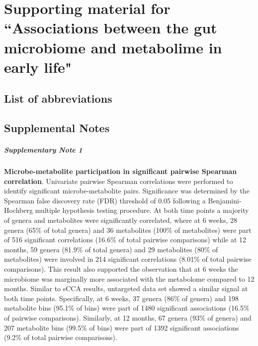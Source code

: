 \chapter{Supporting material for ``Associations between the gut microbiome and metabolime in early life"}

\section{List of abbreviations}

\section{Supplemental Notes} 
\paragraph{Supplementary Note 1}
\label{appB_note1}
{\bf Microbe-metabolite participation in significant pairwise Spearman correlation}. Univariate pairwise Spearman correlations were performed to identify significant microbe-metabolite pairs. Significance was determined by the Spearman false discovery rate (FDR) threshold of 0.05 following a Benjamini-Hochberg multiple hypothesis testing procedure.  At both time points a majority of genera and metabolites were significantly correlated, where at 6 weeks, 28 genera (65\% of total genera) and 36 metabolites (100\% of metabolites) were part of 516 significant correlations (16.6\% of total pairwise comparisons) while at 12 months, 59 genera (81.9\% of total genera) and 29 metabolites (80\% of metabolites) were involved in 214 significant correlations (8.01\% of total pairwise comparisons). This result also supported the observation that at 6 weeks the microbiome was marginally more associated with the metabolome compared to 12 months. Similar to sCCA results, untargeted data set showed a similar signal at both time points. Specifically, at 6 weeks, 37 genera (86\% of genera) and 198 metabolite bins (95.1\% of bins) were part of 1480 significant associations (16.5\% of pairwise comparisons). Similarly, at 12 months, 67 genera (93\% of genera) and 207 metabolite bins (99.5\% of bins) were part of 1392 significant associations (9.2\% of total pairwise comparisons). 

